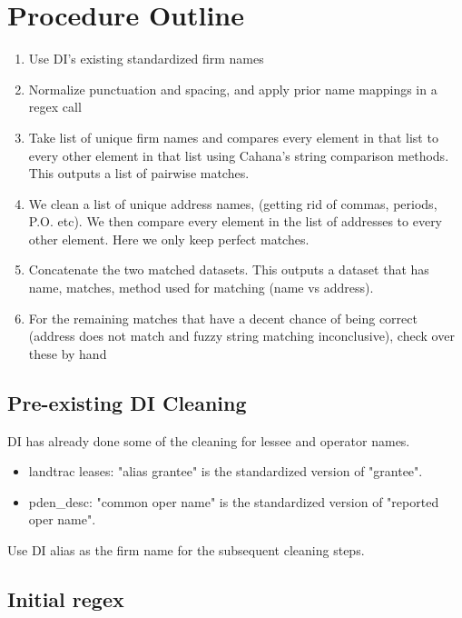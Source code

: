 \documentclass{article}
\begin{document}
\section{Procedure Outline}
\begin{enumerate}
    \item Use DI's existing standardized firm names
    
    \item Normalize punctuation and spacing, and apply prior name mappings in a regex call
    
    \item Take list of unique firm names and compares every element in that list to every other element in that list using Cahana's string comparison methods. This outputs a list of pairwise matches. 
    
    \item We clean a list of unique address names, (getting rid of commas, periods, P.O. etc). We then compare every element in the list of addresses to every other element. Here we only keep perfect matches.  
    
    \item Concatenate the two matched datasets. This outputs a dataset that has name, matches, method used for matching (name vs address).
    
    \item For the remaining matches that have a decent chance of being correct (address does not match and fuzzy string matching inconclusive), check over these by hand
\end{enumerate}

\subsection{Pre-existing DI Cleaning}

DI has already done some of the cleaning for lessee and operator names.
\begin{itemize}
    \item landtrac leases: "alias grantee" is the standardized version of "grantee".
    \item pden\_desc: "common oper name" is the standardized version of "reported oper name".
\end{itemize}

Use DI alias as the firm name for the subsequent cleaning steps.

\subsection{Initial regex}
\end{document}
